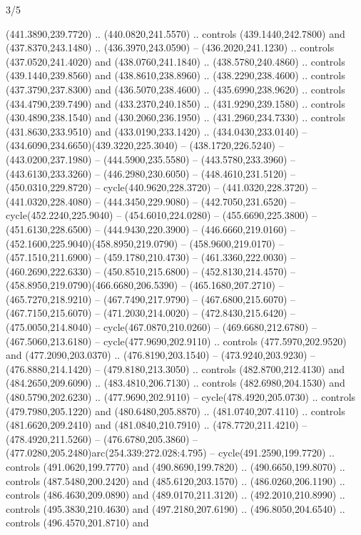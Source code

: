 \begin{flagdescription}{3/5}
\begin{scope}[shift={(0.5\flaglength,0.5\flagwidth)},scale=\flagwidth/1075]
\begin{scope}[y=0.80pt, x=0.80pt, yscale=-2.37, xscale=2.37,xshift=-402,yshift=-230.4]
  (441.3890,239.7720) .. (440.0820,241.5570) .. controls (439.1440,242.7800) and
  (437.8370,243.1480) .. (436.3970,243.0590) -- (436.2020,241.1230) .. controls
  (437.0520,241.4020) and (438.0760,241.1840) .. (438.5780,240.4860) .. controls
  (439.1440,239.8560) and (438.8610,238.8960) .. (438.2290,238.4600) .. controls
  (437.3790,237.8300) and (436.5070,238.4600) .. (435.6990,238.9620) .. controls
  (434.4790,239.7490) and (433.2370,240.1850) .. (431.9290,239.1580) .. controls
  (430.4890,238.1540) and (430.2060,236.1950) .. (431.2960,234.7330) .. controls
  (431.8630,233.9510) and (433.0190,233.1420) .. (434.0430,233.0140) --
  (434.6090,234.6650)(439.3220,225.3040) -- (438.1720,226.5240) --
  (443.0200,237.1980) -- (444.5900,235.5580) -- (443.5780,233.3960) --
  (443.6130,233.3260) -- (446.2980,230.6050) -- (448.4610,231.5120) --
  (450.0310,229.8720) -- cycle(440.9620,228.3720) -- (441.0320,228.3720) --
  (441.0320,228.4080) -- (444.3450,229.9080) -- (442.7050,231.6520) --
  cycle(452.2240,225.9040) -- (454.6010,224.0280) -- (455.6690,225.3800) --
  (451.6130,228.6500) -- (444.9430,220.3900) -- (446.6660,219.0160) --
  (452.1600,225.9040)(458.8950,219.0790) -- (458.9600,219.0170) --
  (457.1510,211.6900) -- (459.1780,210.4730) -- (461.3360,222.0030) --
  (460.2690,222.6330) -- (450.8510,215.6800) -- (452.8130,214.4570) --
  (458.8950,219.0790)(466.6680,206.5390) -- (465.1680,207.2710) --
  (465.7270,218.9210) -- (467.7490,217.9790) -- (467.6800,215.6070) --
  (467.7150,215.6070) -- (471.2030,214.0020) -- (472.8430,215.6420) --
  (475.0050,214.8040) -- cycle(467.0870,210.0260) -- (469.6680,212.6780) --
  (467.5060,213.6180) -- cycle(477.9690,202.9110) .. controls
  (477.5970,202.9520) and (477.2090,203.0370) .. (476.8190,203.1540) --
  (473.9240,203.9230) -- (476.8880,214.1420) -- (479.8180,213.3050) .. controls
  (482.8700,212.4130) and (484.2650,209.6090) .. (483.4810,206.7130) .. controls
  (482.6980,204.1530) and (480.5790,202.6230) .. (477.9690,202.9110) --
  cycle(478.4920,205.0730) .. controls (479.7980,205.1220) and
  (480.6480,205.8870) .. (481.0740,207.4110) .. controls (481.6620,209.2410) and
  (481.0840,210.7910) .. (478.7720,211.4210) -- (478.4920,211.5260) --
  (476.6780,205.3860) -- (477.0280,205.2480)arc(254.339:272.028:4.795) --
  cycle(491.2590,199.7720) .. controls (491.0620,199.7770) and
  (490.8690,199.7820) .. (490.6650,199.8070) .. controls (487.5480,200.2420) and
  (485.6120,203.1570) .. (486.0260,206.1190) .. controls (486.4630,209.0890) and
  (489.0170,211.3120) .. (492.2010,210.8990) .. controls (495.3830,210.4630) and
  (497.2180,207.6190) .. (496.8050,204.6540) .. controls (496.4570,201.8710) and

\end{scope}
\end{scope}
\end{flagdescription}
